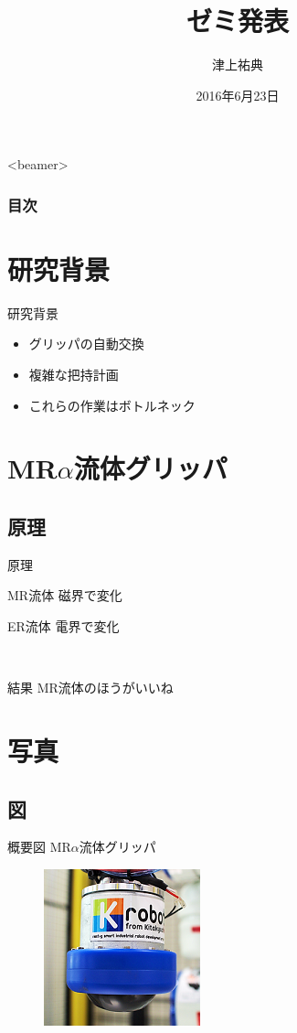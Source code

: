 \documentclass[dvipdfmx]{beamer}
\title[Slides with Beamer]{ゼミ発表}
\institute{西田研究室}
\author[Hanako Daito]{津上祐典}
\date[June 12 2013]{2016年6月23日}
\begin{document}
\begin{frame}
 \titlepage 
\end{frame}

\begin{frame}<beamer> 
  \frametitle{目次}
  \tableofcontents
\end{frame}

\section{研究背景} %
\begin{frame}{研究背景} %
 \begin{itemize}
  \item グリッパの自動交換
  \item 複雑な把持計画
  \item これらの作業は\alert{ボトルネック}
 \end{itemize}
\end{frame} 

\section{MR$\alpha$流体グリッパ}

\subsection{原理}
\begin{frame}{原理}
\begin{block}{MR流体} 
磁界で変化
\end{block}
\begin{example}{ER流体}
電界で変化
\end{example}

\pause　%
\begin{alertblock}{結果}
MR流体のほうがいいね
\end{alertblock}
\end{frame}



\section{写真}

\subsection{図}

\begin{frame}{概要図}
MR$\alpha$流体グリッパ
\begin{figure}
\includegraphics[scale=1,bb = 0 0 171 171]{fig/s_gripperp.png}
\end{figure}
\end{frame}
\end{document}

